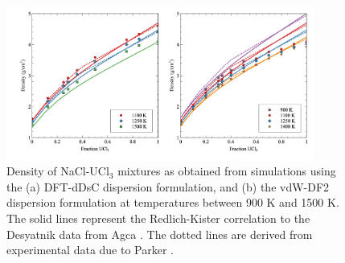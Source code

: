 \documentclass[preprint,3p,10pt,onecolumn,number,sort&compress]{elsarticle}
\begin{document}
{\begin{figure}[htb]
\centering
\includegraphics[width=0.9\textwidth]{fig6.jpg}
\caption{Density of NaCl-UCl$_3$ mixtures as obtained from simulations using the (a) DFT-dDsC dispersion formulation, and (b) the vdW-DF2 dispersion formulation at temperatures between 900 K and 1500 K. The solid lines represent the Redlich-Kister correlation to the Desyatnik \cite{Desyatnik} data from Agca \cite{agca2022}. The dotted lines are derived from experimental data due to Parker \cite{Parker}.%
} 
\label{fig:NaClUCl3}
\end{figure}

}
\end{document}
